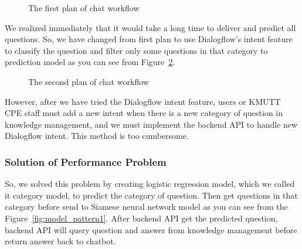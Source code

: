 \documentclass[12pt,oneside,openright,a4paper]{cpe-english-project}
\begin{document}
\begin{figure}[!h]\centering
{}
\caption{The first plan of chat workflow}
\label{fig:chat_plan_1}
\end{figure}

We realized immediately that it would take a long time to deliver and predict all questions.
So, we have changed from first plan to use Dialogflow's intent feature to classify the question and filter
only some questions in that category to prediction model as you can see from
Figure~\ref*{fig:chat_plan_2}.

\begin{figure}[!h]\centering
{}
\caption{The second plan of chat workflow}
\label{fig:chat_plan_2}
\end{figure}

However, after we have tried the Dialogflow intent feature, users or KMUTT CPE staff must add a new intent
when there is a new category of question in knowledge management, and we must implement the backend
API to handle new Dialogflow intent. This method is too cumbersome.

\subsubsection{Solution of Performance Problem}
So, we solved this problem by creating logistic regression model, which we called it category model,
to predict the category of question. Then get questions in that category before send to Siamese neural
network model as you can see from the Figure~\ref*{fig:model_pattern1}. After backend API get the
predicted question, backend API will query question and answer from knowledge management before
return answer back to chatbot.
\end{document}
